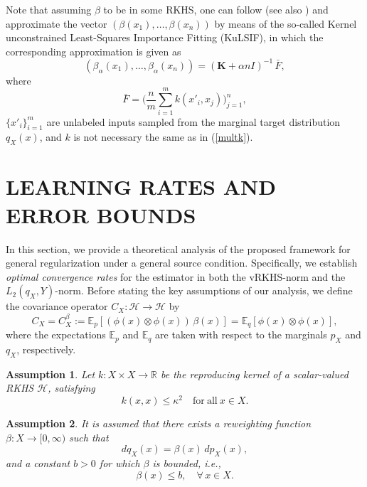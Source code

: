 \documentclass[twoside,11pt]{article}
\newtheorem{assumption}{Assumption}
\begin{document}
\noindent
{Note that assuming $\beta$ to be in some RKHS, one can  follow \cite{IWRLS1} (see also \cite{ALPHA-SELECTION}) and approximate the vector $(\beta(x_1),\ldots,\beta(x_n))$ by means of the so-called Kernel unconstrained Least-Squares Importance Fitting (KuLSIF), in which the corresponding approximation  is given as
\begin{equation}\label{beta}
    (\beta_{\alpha}(x_1),\ldots,\beta_{\alpha}(x_n)) = (\mathbf{K} + \alpha nI)^{-1}\,\bar{F},
\end{equation}
where 
\[
    \bar{F} = \bigg( \frac{n}{m} \sum_{i=1}^m k(x'_i, x_j) \bigg)_{j=1}^n,
\]
$\{x'_i\}_{i=1}^m$ are unlabeled inputs sampled from the marginal target distribution $q_X(x)$, and $k$ is not necessary the same as in (\ref{multk}).}

\section{LEARNING RATES AND ERROR BOUNDS}\label{sec:proof}
\noindent
In this section, we provide a theoretical analysis of the proposed framework for general regularization under a general source condition. 
Specifically, we establish \emph{optimal convergence rates} for the estimator in both the vRKHS-norm and the $L_2(q_X, Y)$-norm. 
Before stating the key assumptions of our analysis, we define the covariance operator
$C_X : \mathcal{H} \to \mathcal{H}$ by
\[
C_X = C_X^\beta
:= \mathbb{E}_{p}\!\left[(\phi(x)\otimes\phi(x))\,\beta(x)\right]
= \mathbb{E}_{q}\!\left[\phi(x)\otimes\phi(x)\right],
\]
where the expectations $\mathbb{E}_p$ and $\mathbb{E}_q$ are taken with respect to the
marginals $p_X$ and $q_X$, respectively.




\begin{assumption}\label{kernel-bound}
Let $k : X \times X \to \mathbb{R}$ be the reproducing kernel of a scalar-valued RKHS $\mathcal{H}$, satisfying
\[
k(x,x) \le \kappa^2 \quad \mathrm{for\ all}\ x \in X .
\]
\end{assumption}




\begin{assumption}\label{bridingassumption}
It is assumed that there exists a reweighting function $\beta : X \to [0,\infty)$ such that 
\[
dq_X(x) = \beta(x)\, dp_X(x),
\]
and a constant $b > 0$ for which $\beta$ is bounded, i.e.,
\[
\beta(x) \leq b, \quad \forall\, x \in X.
\]

    
\end{assumption}
\end{document}
